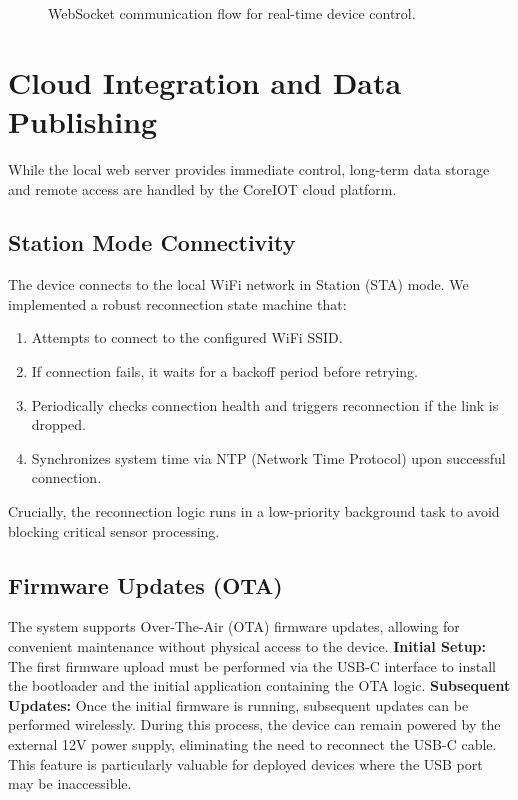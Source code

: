 \begin{figure}[H]
    \centering
    \caption{WebSocket communication flow for real-time device control.}
    \label{fig:websocket_flow}
\end{figure}

\section{Cloud Integration and Data Publishing}

While the local web server provides immediate control, long-term data storage and remote access are handled by the CoreIOT cloud platform.

\subsection{Station Mode Connectivity}

The device connects to the local WiFi network in Station (STA) mode. We implemented a robust reconnection state machine that:
\begin{enumerate}
    \item Attempts to connect to the configured WiFi SSID.
    \item If connection fails, it waits for a backoff period before retrying.
    \item Periodically checks connection health and triggers reconnection if the link is dropped.
    \item Synchronizes system time via NTP (Network Time Protocol) upon successful connection.
\end{enumerate}

Crucially, the reconnection logic runs in a low-priority background task to avoid blocking critical sensor processing.
\subsection{Firmware Updates (OTA)}
The system supports Over-The-Air (OTA) firmware updates, allowing for convenient maintenance without physical access to the device.
\textbf{Initial Setup:} The first firmware upload must be performed via the USB-C interface to install the bootloader and the initial application containing the OTA logic.
\textbf{Subsequent Updates:} Once the initial firmware is running, subsequent updates can be performed wirelessly. During this process, the device can remain powered by the external 12V power supply, eliminating the need to reconnect the USB-C cable. This feature is particularly valuable for deployed devices where the USB port may be inaccessible.

